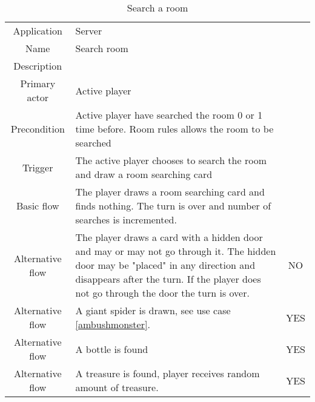 \documentclass[a4paper,10pt]{report}
\begin{document}
\begin{table}
\caption{Search a room}
\label{searchroom}
\begin{tabular}{|c| p{9cm}|c}
\hline
Application & Server & \\
Name & Search room & \\
Description &  & \\
Primary actor & Active player & \\
Precondition & Active player have searched the room 0 or 1 time before. Room rules allows the room to be searched  & \\
Trigger & The active player chooses to search the room and draw a room searching card  & \\ \hline
Basic flow & The player draws a room searching card and finds nothing. The turn is over and number of searches is incremented. & \\ \hline
Alternative flow & The player draws a card with a hidden door and may or may not go through it. The hidden door may be "placed" in any direction and disappears after the turn. If the player does not go through the door the turn is over. & NO \\\hline
Alternative flow & A giant spider is drawn, see use case \ref{ambushmonster}. & YES \\ \hline
Alternative flow & A bottle is found & YES \\ \hline
Alternative flow & A treasure is found, player receives random amount of treasure. & YES \\
\hline
\end{tabular}
\end{table}
\end{document}
